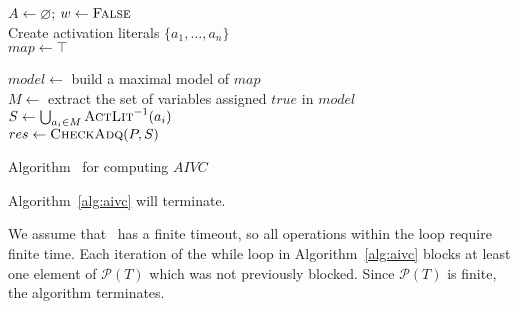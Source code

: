\begin{algorithm}[t]
  \BlankLine
  $A \leftarrow \varnothing$; $w \leftarrow \textsc{False}$ \\
  Create activation literals $\{a_1, \ldots, a_n\}$ \\
  $map \leftarrow \top$ \\
  \BlankLine

   { \label{alg:aivc:checksat}
    $model \leftarrow $ build a maximal model of $map$  \label{alg:aivc:maxsat} \\
    $M \leftarrow$ extract the set of variables assigned $true$ in $model$ \label{alg:aivc:assignm}\\
    $S \leftarrow \bigcup_{a_i \in M} \textsc{ActLit} ^{-1}(a_i)$ \label{alg:aivc:assigns}\\
    $res \leftarrow \textsc{CheckAdq} (P, S)$ \\
  }
\caption{Algorithm \aivcalg ~for computing $AIVC$}
\label{alg:aivc}
\end{algorithm}


\begin{theorem}
\label{theorem:termination}
  Algorithm~\ref{alg:aivc} will terminate.
\end{theorem}
\begin{IEEEproof}
We assume that \isadeq\ has a finite timeout, so all operations within the
loop require finite time.  Each iteration of the while loop in Algorithm~\ref{alg:aivc} blocks at least one element of $\mathcal{P}(T)$ which was not previously
blocked. Since $\mathcal{P}(T)$ is finite, the algorithm terminates.
\end{IEEEproof}


